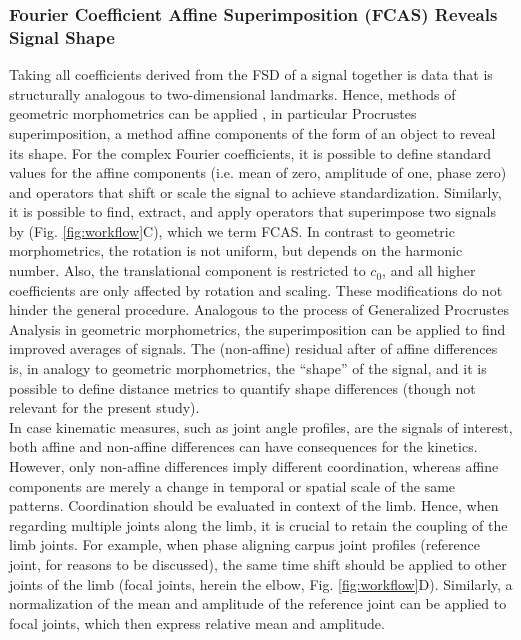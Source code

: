 \subsubsection{Fourier Coefficient Affine Superimposition (FCAS) Reveals Signal Shape}
Taking all coefficients derived from the FSD of a signal together is data that is structurally analogous to two-dimensional landmarks.
Hence, methods of geometric morphometrics can be applied \citep{Bookstein1991,Kendall1989,Gower1975,Dryden2016}, in particular Procrustes superimposition, a method  affine components of the form of an object to reveal its shape.
For the complex Fourier coefficients, it is possible to define standard values for the affine components (i.e. mean of zero, amplitude of one, phase zero) and operators that shift or scale the signal to achieve standardization.
Similarly, it is possible to find, extract, and apply operators that superimpose two signals by  (Fig. \ref{fig:workflow}C), which we term FCAS.
In contrast to geometric morphometrics, the rotation is not uniform, but depends on the harmonic number.
Also, the translational component is restricted to $c_{0}$, and all higher coefficients are only affected by rotation and scaling.
These modifications do not hinder the general procedure.
Analogous to the process of Generalized Procrustes Analysis in geometric morphometrics, the superimposition can be applied to find improved averages of signals.
The (non-affine) residual after  of affine differences is, in analogy to geometric morphometrics, the ``shape'' of the signal, and it is possible to define distance metrics to quantify shape differences (though not relevant for the present study).
\\In case kinematic measures, such as joint angle profiles, are the signals of interest, both affine and non-affine differences can have consequences for the kinetics.
However, only non-affine differences imply different coordination, whereas affine components are merely a change in temporal or spatial scale of the same patterns.
Coordination should be evaluated in context of the limb.
Hence, when regarding multiple joints along the limb, it is crucial to retain the coupling of the limb joints.
For example, when phase aligning carpus joint profiles (reference joint, for reasons to be discussed), the same time shift should be applied to other joints of the limb (focal joints, herein the elbow, Fig. \ref{fig:workflow}D).
Similarly, a normalization of the mean and amplitude of the reference joint can be applied to focal joints, which then express relative mean and amplitude.
